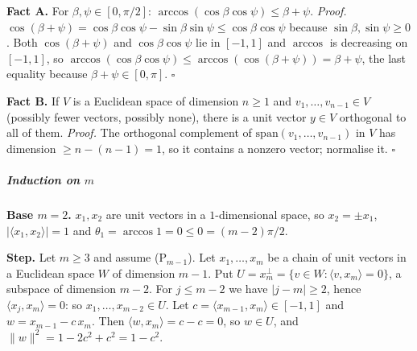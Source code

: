 \documentclass[11pt,a4paper]{article}
\begin{document}
\textbf{Fact A.} For \(\beta,\psi\in[0,\pi/2]\):
\(\arccos(\cos\beta\cos\psi)\le\beta+\psi\). \emph{Proof.}
\(\cos(\beta+\psi)=\cos\beta\cos\psi-\sin\beta\sin\psi\le\cos\beta\cos\psi\)
because \(\sin\beta,\sin\psi\ge0\). Both \(\cos(\beta+\psi)\) and
\(\cos\beta\cos\psi\) lie in \([-1,1]\) and \(\arccos\) is decreasing on
\([-1,1]\), so
\(\arccos(\cos\beta\cos\psi)\le\arccos(\cos(\beta+\psi))=\beta+\psi\),
the last equality because \(\beta+\psi\in[0,\pi]\). \(\square\)

\textbf{Fact B.} If \(V\) is a Euclidean space of dimension \(n\ge1\)
and \(v_1,\dots,v_{n-1}\in V\) (possibly fewer vectors, possibly none),
there is a unit vector \(y\in V\) orthogonal to all of them.
\emph{Proof.} The orthogonal complement of
\(\mathrm{span}(v_1,\dots,v_{n-1})\) in \(V\) has dimension
\(\ge n-(n-1)=1\), so it contains a nonzero vector; normalise it.
\(\square\)

\subparagraph{\texorpdfstring{Induction on
\(m\)}{Induction on m}}\label{induction-on-m}

\textbf{Base \(m=2\).} \(x_1,x_2\) are unit vectors in a
\(1\)-dimensional space, so \(x_2=\pm x_1\),
\(|\langle x_1,x_2\rangle|=1\) and
\(\theta_1=\arccos 1=0\le0=(m-2)\pi/2\).

\textbf{Step.} Let \(m\ge3\) and assume (P\(_{m-1}\)). Let
\(x_1,\dots,x_m\) be a chain of unit vectors in a Euclidean space \(W\)
of dimension \(m-1\). Put
\(U=x_m^{\perp}=\{v\in W:\langle v,x_m\rangle=0\}\), a subspace of
dimension \(m-2\). For \(j\le m-2\) we have \(|j-m|\ge2\), hence
\(\langle x_j,x_m\rangle=0\): so \(x_1,\dots,x_{m-2}\in U\). Let
\(c=\langle x_{m-1},x_m\rangle\in[-1,1]\) and \(w=x_{m-1}-c\,x_m\). Then
\(\langle w,x_m\rangle=c-c=0\), so \(w\in U\), and
\(\|w\|^2=1-2c^2+c^2=1-c^2\).
\end{document}
